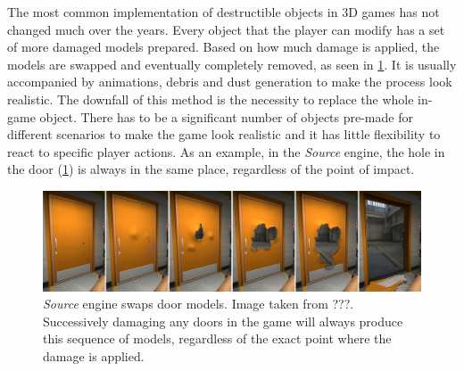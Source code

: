 The most common implementation of destructible objects in 3D games has not changed much over the years. Every object that the player can modify has a set of more damaged models prepared. Based on how much damage is applied, the models are swapped and eventually completely removed, as seen in \cref{fig:doors}. It is usually accompanied by animations, debris and dust generation to make the process look realistic. The downfall of this method is the necessity to replace the whole in-game object. There has to be a significant number of objects pre-made for different scenarios to make the game look realistic and it has little flexibility to react to specific player actions. As an example, in the \emph{Source} engine, the hole in the door (\cref{fig:doors}) is always in the same place, regardless of the point of impact.


\begin{figure} %
\centering
\includegraphics[width=\textwidth]{img/doors}
\caption{\emph{Source} engine swaps door models. Image taken from ???. Successively damaging any doors in the game will always produce this sequence of models, regardless of the exact point where the damage is applied.}
\label{fig:doors}
\end{figure}


